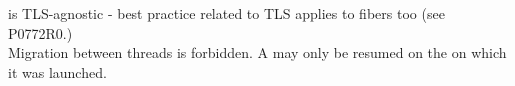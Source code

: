 
\fiber is TLS-agnostic - best practice related to TLS applies to fibers too
(see P0772R0.)\\
Migration between threads is forbidden. A \fiber may only be resumed on the
 on which it was launched.
